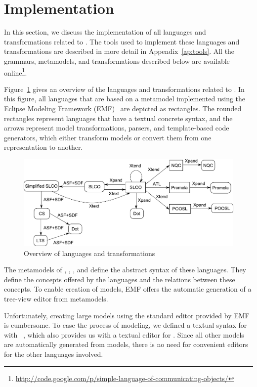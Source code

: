 \section{Implementation}

In this section, we discuss the implementation of all languages and transformations related to \SLCO.
The tools used to implement these languages and transformations are described in more detail in Appendix~\ref{ap:tools}.
All the grammars, metamodels, and transformations described below are available online\footnote{\url{http://code.google.com/p/simple-language-of-communicating-objects/}}.

Figure~\ref{fig:slco:implementation-overview} gives an overview of the languages and transformations related to \SLCO.
In this figure, all languages that are based on a metamodel implemented using the Eclipse Modeling Framework (EMF)~\cite{Steinberg2008} are depicted as rectangles.
The rounded rectangles represent languages that have a textual concrete syntax, and the arrows represent model transformations, parsers, and template-based code generators, which either transform models or convert them from one representation to another.

\begin{figure}[hbt]
\centering
\includegraphics[scale=.49]{iterative-dsl-evolution/figs/overview}
\caption{Overview of languages and transformations}
\label{fig:slco:implementation-overview}
\end{figure}

The metamodels of \SLCO, \NQC, \Promela, and \POOSL define the abstract syntax of these languages.
They define the concepts offered by the languages and the relations between these concepts.
To enable creation of models, EMF offers the automatic generation of a tree-view editor from metamodels.

Unfortunately, creating large models using the standard editor provided by EMF is cumbersome.
To ease the process of modeling, we defined a textual syntax for \SLCO with \Xtext~\cite{Efftinge2006xText}, which also provides us with a textual editor for \SLCO.
Since all other models are automatically generated from \SLCO models, there is no need for convenient editors for the other languages involved.

